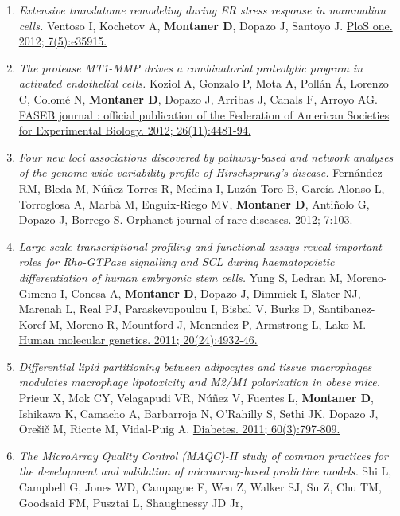\begin{enumerate}
\item
  \emph{Extensive translatome remodeling during ER stress response in
  mammalian cells.} Ventoso I, Kochetov A, \textbf{Montaner D}, Dopazo
  J, Santoyo J. \href{http://www.ncbi.nlm.nih.gov//pubmed/22574127}{PloS
  one. 2012; 7(5):e35915.}
\item
  \emph{The protease MT1-MMP drives a combinatorial proteolytic program
  in activated endothelial cells.} Koziol A, Gonzalo P, Mota A, Pollán
  Á, Lorenzo C, Colomé N, \textbf{Montaner D}, Dopazo J, Arribas J,
  Canals F, Arroyo AG.
  \href{http://www.ncbi.nlm.nih.gov//pubmed/22859368}{FASEB journal :
  official publication of the Federation of American Societies for
  Experimental Biology. 2012; 26(11):4481-94.}
\item
  \emph{Four new loci associations discovered by pathway-based and
  network analyses of the genome-wide variability profile of
  Hirschsprung's disease.} Fernández RM, Bleda M, Núñez-Torres R, Medina
  I, Luzón-Toro B, García-Alonso L, Torroglosa A, Marbà M, Enguix-Riego
  MV, \textbf{Montaner D}, Antiñolo G, Dopazo J, Borrego S.
  \href{http://www.ncbi.nlm.nih.gov//pubmed/23270508}{Orphanet journal
  of rare diseases. 2012; 7:103.}
\item
  \emph{Large-scale transcriptional profiling and functional assays
  reveal important roles for Rho-GTPase signalling and SCL during
  haematopoietic differentiation of human embryonic stem cells.} Yung S,
  Ledran M, Moreno-Gimeno I, Conesa A, \textbf{Montaner D}, Dopazo J,
  Dimmick I, Slater NJ, Marenah L, Real PJ, Paraskevopoulou I, Bisbal V,
  Burks D, Santibanez-Koref M, Moreno R, Mountford J, Menendez P,
  Armstrong L, Lako M.
  \href{http://www.ncbi.nlm.nih.gov//pubmed/21937587}{Human molecular
  genetics. 2011; 20(24):4932-46.}
\item
  \emph{Differential lipid partitioning between adipocytes and tissue
  macrophages modulates macrophage lipotoxicity and M2/M1 polarization
  in obese mice.} Prieur X, Mok CY, Velagapudi VR, Núñez V, Fuentes L,
  \textbf{Montaner D}, Ishikawa K, Camacho A, Barbarroja N, O'Rahilly S,
  Sethi JK, Dopazo J, Orešič M, Ricote M, Vidal-Puig A.
  \href{http://www.ncbi.nlm.nih.gov//pubmed/21266330}{Diabetes. 2011;
  60(3):797-809.}
\item
  \emph{The MicroArray Quality Control (MAQC)-II study of common
  practices for the development and validation of microarray-based
  predictive models.} Shi L, Campbell G, Jones WD, Campagne F, Wen Z,
  Walker SJ, Su Z, Chu TM, Goodsaid FM, Pusztai L, Shaughnessy JD Jr,

\end{enumerate}
